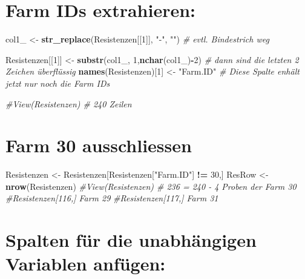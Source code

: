 \documentclass[
]{article}
\newenvironment{Shaded}{\begin{snugshade}}{\end{snugshade}}
\newcommand{\CommentTok}[1]{\textcolor[rgb]{0.56,0.35,0.01}{\textit{#1}}}
\newcommand{\DecValTok}[1]{\textcolor[rgb]{0.00,0.00,0.81}{#1}}
\newcommand{\KeywordTok}[1]{\textcolor[rgb]{0.13,0.29,0.53}{\textbf{#1}}}
\newcommand{\NormalTok}[1]{#1}
\newcommand{\OperatorTok}[1]{\textcolor[rgb]{0.81,0.36,0.00}{\textbf{#1}}}
\newcommand{\StringTok}[1]{\textcolor[rgb]{0.31,0.60,0.02}{#1}}
\begin{document}
\hypertarget{farm-ids-extrahieren}{%
\section{Farm IDs extrahieren:}\label{farm-ids-extrahieren}}

\begin{Shaded}
\begin{Highlighting}[]
\NormalTok{col1_ <-}\StringTok{ }\KeywordTok{str_replace}\NormalTok{(Resistenzen[[}\DecValTok{1}\NormalTok{]], }\StringTok{"-"}\NormalTok{,  }\StringTok{""}\NormalTok{)     }\CommentTok{# evtl. Bindestrich weg}

\NormalTok{Resistenzen[[}\DecValTok{1}\NormalTok{]] <-}\StringTok{ }\KeywordTok{substr}\NormalTok{(col1_, }\DecValTok{1}\NormalTok{,}\KeywordTok{nchar}\NormalTok{(col1_)}\OperatorTok{-}\DecValTok{2}\NormalTok{)  }\CommentTok{# dann sind die letzten 2 Zeichen überflüssig}
\KeywordTok{names}\NormalTok{(Resistenzen)[}\DecValTok{1}\NormalTok{] <-}\StringTok{ "Farm.ID"}                   \CommentTok{# Diese Spalte enhält jetzt nur noch die Farm IDs}

\CommentTok{#View(Resistenzen)                                   # 240 Zeilen}
\end{Highlighting}
\end{Shaded}

\hypertarget{farm-30-ausschliessen}{%
\section{Farm 30 ausschliessen}\label{farm-30-ausschliessen}}

\begin{Shaded}
\begin{Highlighting}[]
\NormalTok{Resistenzen <-}\StringTok{ }\NormalTok{Resistenzen[Resistenzen[}\StringTok{"Farm.ID"}\NormalTok{] }\OperatorTok{!=}\StringTok{ }\DecValTok{30}\NormalTok{,]}
\NormalTok{ResRow <-}\StringTok{ }\KeywordTok{nrow}\NormalTok{(Resistenzen)}
\CommentTok{#View(Resistenzen)                                  # 236 = 240 - 4 Proben der Farm 30}
\CommentTok{#Resistenzen[116,] Farm 29}
\CommentTok{#Resistenzen[117,] Farm 31}
\end{Highlighting}
\end{Shaded}

\hypertarget{spalten-fuxfcr-die-unabhuxe4ngigen-variablen-anfuxfcgen}{%
\section{Spalten für die unabhängigen Variablen
anfügen:}\label{spalten-fuxfcr-die-unabhuxe4ngigen-variablen-anfuxfcgen}}
\end{document}
